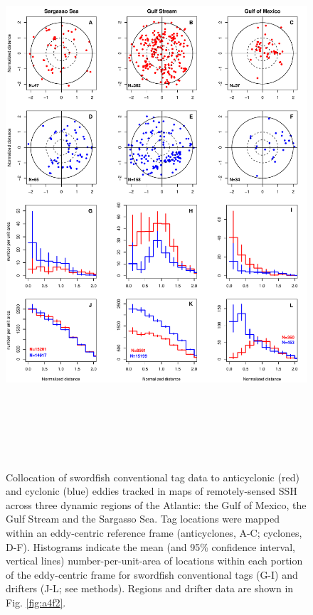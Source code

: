\begin{figure}[htbp]
\centering
\includegraphics[height=8in, keepaspectratio]{images/C4_Fig5.pdf}
\caption[Collocation of swordfish conventional tag data to anticyclonic and cyclonic eddies across three dynamic regions of the Atlantic]{Collocation of swordfish conventional tag data to anticyclonic (red) and cyclonic (blue) eddies tracked in maps of remotely-sensed SSH across three dynamic regions of the Atlantic: the Gulf of Mexico, the Gulf Stream and the Sargasso Sea. Tag locations were mapped within an eddy-centric reference frame (anticyclones, A-C; cyclones, D-F). Histograms indicate the mean (and 95\% confidence interval, vertical lines) number-per-unit-area of locations within each portion of the eddy-centric frame for swordfish conventional tags (G-I) and drifters (J-L; see methods). Regions and drifter data are shown in Fig. \ref{fig:a4f2}.}
\label{fig:c4f5}
\end{figure}

